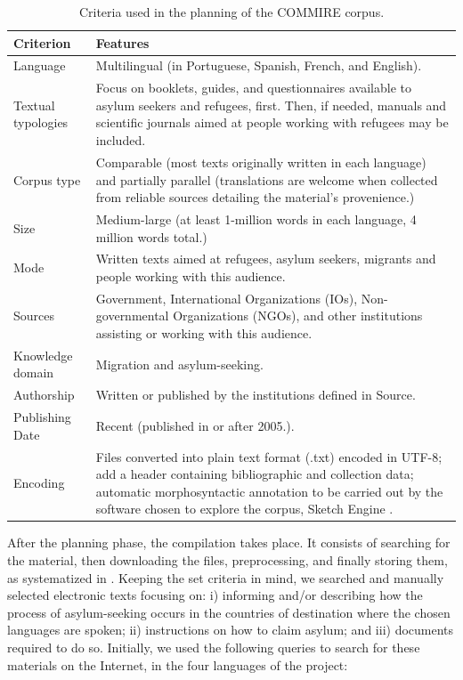 \documentclass[english]{textolivre}
\begin{document}
\begin{table}[htbp]
\caption{Criteria used in the planning of the COMMIRE corpus.}
\begin{tabular}{lp{10cm}}
\toprule
Criterion & Features  \\
\midrule
Language & Multilingual (in Portuguese, Spanish, French, and English). \\
Textual typologies & Focus on booklets, guides, and questionnaires available to asylum seekers and refugees, first. Then, if needed, manuals and scientific journals aimed at people working with refugees may be included. \\
Corpus type & Comparable (most texts originally written in each language) and partially parallel (translations are welcome when collected from reliable sources detailing the material’s provenience.) \\
Size & Medium-large (at least 1-million words in each language, 4 million words total.) \\
Mode & Written texts aimed at refugees, asylum seekers, migrants and people working with this audience. \\
Sources & Government, International Organizations (IOs), Non-governmental Organizations (NGOs), and other institutions assisting or working with this audience.\\
Knowledge domain & Migration and asylum-seeking.\\
Authorship & Written or published by the institutions defined in Source.\\
Publishing Date & Recent (published in or after 2005.). \\
Encoding & Files converted into plain text format (.txt) encoded in UTF-8; add a header containing bibliographic and collection data; automatic morphosyntactic annotation to be carried out by the software chosen to explore the corpus, Sketch Engine \cite{kilgarriff_sketch_2004}. \\ 
\bottomrule
\end{tabular}
\label{Table02}
\end{table}

After the planning phase, the compilation takes place. It consists of searching for the material, then downloading the files, preprocessing, and finally storing them, as systematized in \textcite{seghiri_metodologiprotocolizada_2011,sanchez_ramos_corpus_2019,sanchez_ramos_documentacion_2020}. Keeping the set criteria in mind, we searched and manually selected electronic texts focusing on: i) informing and/or describing how the process of asylum-seeking occurs in the countries of destination where the chosen languages are spoken; ii) instructions on how to claim asylum; and iii) documents required to do so. Initially, we used the following queries to search for these materials on the Internet, in the four languages of the project:
\end{document}
